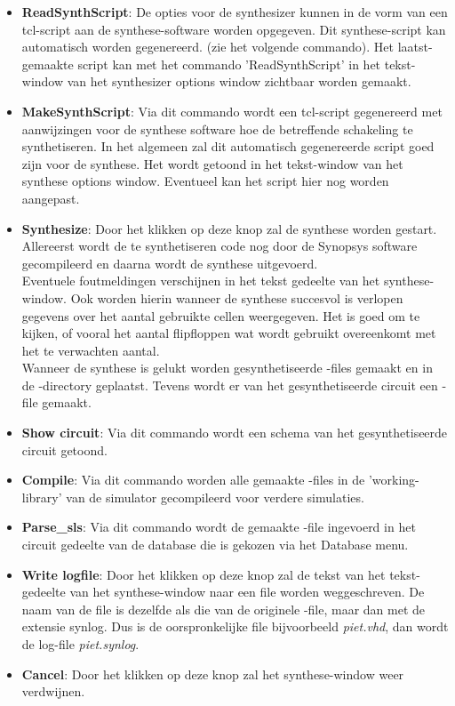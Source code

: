   \begin{itemize}
  \item {\bf ReadSynthScript}: De opties voor de synthesizer kunnen in de vorm van een
                       tcl-script aan de synthese-software worden
                       opgegeven. Dit synthese-script kan automatisch
                       worden gegenereerd. (zie het volgende commando).
                       Het laatst-gemaakte script kan met het commando
                       'ReadSynthScript' in het tekst-window van het
                       synthesizer options window zichtbaar worden gemaakt.
  \item {\bf MakeSynthScript}: Via dit commando wordt een tcl-script gegenereerd
                       met aanwijzingen voor de synthese software hoe de
                       betreffende schakeling te synthetiseren. In het algemeen
                       zal dit automatisch gegenereerde script goed zijn voor
                       de synthese. Het wordt getoond in het tekst-window van
                       het synthese options window. Eventueel kan het script
                       hier nog worden aangepast.
  \item {\bf Synthesize}: Door het klikken op deze knop zal de synthese worden
      gestart. Allereerst wordt de te synthetiseren code nog door
      de Synopsys software gecompileerd en daarna wordt de synthese
      uitgevoerd.\\
      Eventuele foutmeldingen verschijnen in het tekst gedeelte van het
      synthese-window.
      Ook worden hierin wanneer de synthese succesvol is verlopen
      gegevens over het aantal gebruikte cellen weergegeven.
      Het is goed om te kijken, of vooral het aantal flipfloppen wat wordt
      gebruikt overeenkomt met het te verwachten aantal.\\
      Wanneer de synthese is gelukt worden gesynthetiseerde -files
      gemaakt en in de -directory geplaatst.
      Tevens wordt er van het gesynthetiseerde circuit een -file gemaakt.
  \item {\bf Show circuit}: Via dit commando wordt een schema van het
                      gesynthetiseerde circuit getoond.
  \item {\bf Compile}: Via dit commando worden alle gemaakte -files
	in de 'working-library' van de simulator gecompileerd voor verdere simulaties.
  \item {\bf Parse\_sls}: Via dit commando wordt de gemaakte -file ingevoerd
                     in het circuit gedeelte van de  database die
                     is gekozen via het Database menu.
  \item {\bf Write logfile}: Door het klikken op deze knop zal de tekst van het
      tekst-gedeelte van het synthese-window naar een file worden weggeschreven.
      De naam van de file is dezelfde als die van de originele -file,
      maar dan met de extensie synlog.
      Dus is de oorspronkelij\-ke file bijvoorbeeld {\it piet.vhd}, dan wordt de
      log-file {\it piet.synlog}.
  \item {\bf Cancel}: Door het klikken op deze knop zal het synthese-window weer
      verdwijnen.
  \end{itemize}

